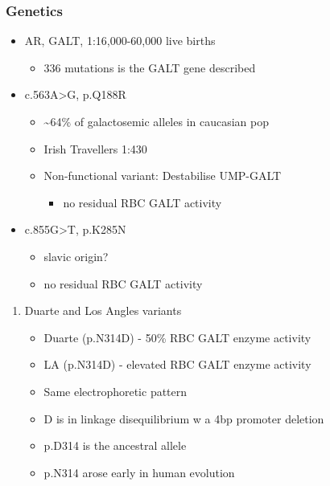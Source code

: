 \documentclass{scrartcl}
\begin{document}
\subsubsection{Genetics}
\label{sec:org4a65efd}
\begin{itemize}
\item AR, GALT, 1:16,000-60,000 live births
\begin{itemize}
\item 336 mutations is the GALT gene described
\end{itemize}
\item c.563A>G, p.Q188R
\begin{itemize}
\item \textasciitilde{}64\% of galactosemic alleles in caucasian pop
\item Irish Travellers 1:430
\item Non-functional variant: Destabilise UMP-GALT
\begin{itemize}
\item no residual RBC GALT activity
\end{itemize}
\end{itemize}
\item c.855G>T, p.K285N
\begin{itemize}
\item slavic origin?
\item no residual RBC GALT activity
\end{itemize}
\end{itemize}
\begin{enumerate}
\item Duarte and Los Angles variants
\label{sec:org96a25b3}
\begin{itemize}
\item Duarte (p.N314D) - 50\% RBC GALT enzyme activity
\item LA (p.N314D) - elevated RBC GALT enzyme activity
\item Same electrophoretic pattern
\item D is in linkage disequilibrium w a 4bp promoter deletion
\item p.D314 is the ancestral allele
\item p.N314 arose early in human evolution
\end{itemize}
\end{enumerate}
\end{document}
